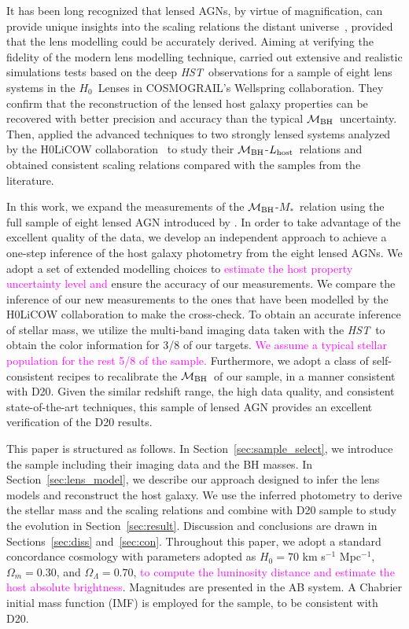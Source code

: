 \documentclass[fleqn,usenatbib]{mnras}
\newcommand{\hst}{{\it HST}}
\newcommand{\hc}{$H_0$}
\newcommand{\mbh}{$\mathcal M_{\rm BH}$}
\newcommand{\lhost}{$L_{\rm host}$}
\newcommand{\mstar}{{$M_*$}}
\newcommand{\pink}[1]{{\textcolor{magenta}{#1}}}
\begin{document}
It has been long recognized that lensed AGNs, by virtue of magnification, can provide unique insights into the scaling relations the distant universe~\citep{Peng2006}, provided that the lens modelling could be accurately derived. Aiming at verifying the fidelity of the modern lens modelling technique, \citet{Ding2017a} carried out extensive and realistic simulations tests based on the deep \hst\ observations for a sample of eight lens systems in the \hc\ Lenses in COSMOGRAIL's Wellspring \citep[H0LiCOW\footnote{\url{http://www.h0licow.org/}},][]{Suyu2017} collaboration. They confirm that the reconstruction of the lensed host galaxy properties can be recovered with better precision and accuracy than the typical \mbh\ uncertainty. Then, \citet{Ding2017b} applied the advanced techniques to two strongly lensed systems analyzed by the H0LiCOW collaboration~\citep{Suyu2013, Wong2017} to study their \mbh-\lhost\ relations and obtained consistent scaling relations compared with the samples from the literature.

In this work, we expand the measurements of the \mbh-\mstar\ relation using the full sample of eight lensed AGN introduced by \citet{Ding2017a}.  In order to take advantage of the excellent quality of the data, we develop an independent approach to achieve a one-step inference of the host galaxy photometry from the eight lensed AGNs. We adopt a set of extended modelling choices to \pink{estimate the host property uncertainty level and} ensure the accuracy of our measurements. We compare the inference of our new measurements to the ones that have been modelled by the H0LiCOW collaboration to make the cross-check. To obtain an accurate inference of stellar mass, we utilize the multi-band imaging data taken with the \hst\ to obtain the color information for 3/8 of our targets. \pink{We assume a typical stellar population for the rest 5/8 of the sample.} Furthermore, we adopt a class of self-consistent recipes to recalibrate the \mbh\ of our sample, in a manner consistent with D20. Given the similar redshift range, the high data quality, and consistent state-of-the-art techniques, this sample of lensed AGN provides an excellent verification of the D20 results.

This paper is structured as follows. In Section~\ref{sec:sample_select}, we introduce the sample including their imaging data and the BH masses. In Section~\ref{sec:lens_model}, we describe our approach designed to infer the lens models and reconstruct the host galaxy. We use the inferred photometry to derive the stellar mass and the scaling relations and combine with D20 sample to study the evolution in Section~\ref{sec:result}. Discussion and conclusions are drawn in Sections~\ref{sec:diss} and~\ref{sec:con}. Throughout this paper, we adopt a standard concordance cosmology with parameters adopted as $H_0= 70$ km s$^{-1}$ Mpc$^{-1}$, $\Omega{_m} = 0.30$, and $\Omega{_\Lambda} = 0.70$, \pink{to compute the luminosity distance and estimate the host absolute brightness}. Magnitudes are presented in the AB system. A Chabrier initial mass function (IMF) is employed for the sample, to be consistent with D20.
\end{document}
